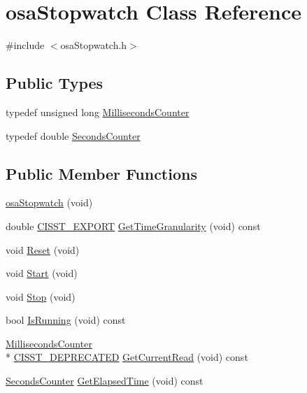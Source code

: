 \hypertarget{classosa_stopwatch}{\section{osa\-Stopwatch Class Reference}
\label{classosa_stopwatch}
}


{\ttfamily \#include $<$osa\-Stopwatch.\-h$>$}

\subsection*{Public Types}
\begin{DoxyCompactItemize}
\item 
typedef unsigned long \hyperlink{classosa_stopwatch_a1965d1eca46d883235a26d1ee2920c2f}{Milliseconds\-Counter}
\item 
typedef double \hyperlink{classosa_stopwatch_af99ed194ad28f06f68aa66c81ae93517}{Seconds\-Counter}
\end{DoxyCompactItemize}
\subsection*{Public Member Functions}
\begin{DoxyCompactItemize}
\item 
\hyperlink{classosa_stopwatch_ac84e6730acab9c10fdd183fbc570dd48}{osa\-Stopwatch} (void)
\item 
double \hyperlink{cmn_export_macros_8h_a99393e0c3ac434b2605235bbe20684f8}{C\-I\-S\-S\-T\-\_\-\-E\-X\-P\-O\-R\-T} \hyperlink{classosa_stopwatch_aaeee3a1a11b82430e3deeab9e040ff7d}{Get\-Time\-Granularity} (void) const 
\item 
void \hyperlink{classosa_stopwatch_ab01ee43dc8f0aa7dc395952391abfa2c}{Reset} (void)
\item 
void \hyperlink{classosa_stopwatch_aabe27a9580a1c91dd5f9af3fa8e43c76}{Start} (void)
\item 
void \hyperlink{classosa_stopwatch_abe78ec771bed0e97d42d51251f16046c}{Stop} (void)
\item 
bool \hyperlink{classosa_stopwatch_a30e67dba34aef8524473bd82a253aba1}{Is\-Running} (void) const 
\item 
\hyperlink{classosa_stopwatch_a1965d1eca46d883235a26d1ee2920c2f}{Milliseconds\-Counter} \\*
\hyperlink{cmn_portability_8h_a63da7164735f9501be651b1f2bbc0121}{C\-I\-S\-S\-T\-\_\-\-D\-E\-P\-R\-E\-C\-A\-T\-E\-D} \hyperlink{classosa_stopwatch_a874511bfee93600d9c47d43b3e5c3f9d}{Get\-Current\-Read} (void) const 
\item 
\hyperlink{classosa_stopwatch_af99ed194ad28f06f68aa66c81ae93517}{Seconds\-Counter} \hyperlink{classosa_stopwatch_a437cf8dbddb7a176baa506ca4a882935}{Get\-Elapsed\-Time} (void) const 
\end{DoxyCompactItemize}


